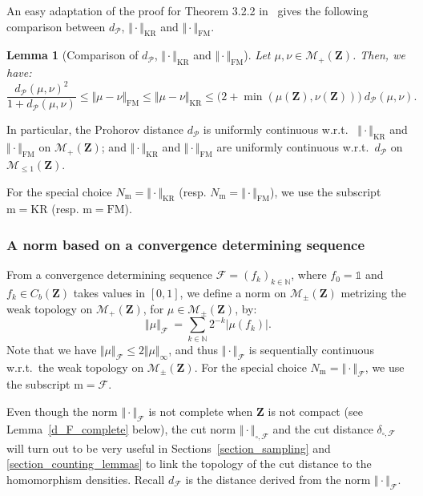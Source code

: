 \documentclass{amsart}
\newcommand{\wrt}{w.r.t.\ }
\theoremstyle{plain}
\newtheorem{lemme}[Th]{Lemma}
\theoremstyle{definition}
\newcommand{\Space}{\mathbf{Z}}
\newcommand{\SubProba}{\mathcal{M}_{\leq1}(\Space)}
\newcommand{\Meas}{\mathcal{M}_+(\Space)}
\newcommand{\SignedMeas}{\mathcal{M}_{\pm}(\Space)}
\newcommand{\CbFunct}{C_b(\Space)}
\newcommand{\TotalMass}[1]{\norm{#1}_\infty}
\newcommand{\m}{\mathrm{m}}
\newcommand{\NmeasSymbol}{N_\m}
\newcommand{\dmeasF}{d_{\mathcal{F}}}
\newcommand{\NmeasF}[1]{\Vert#1\Vert_{\mathcal{F}}}
\newcommand{\NmeasFSymbol}{\Vert\cdot\Vert_{\mathcal{F}}}
\newcommand{\NcutFSymbol}{\Vert\cdot\Vert_{\square,\mathcal{F}}}
\newcommand{\ddcutF}{\delta_{\square,\mathcal{F}}}
\newcommand{\F}{\mathcal{F}}
\newcommand{\dmeasP}{d_{\mathcal{P}}}
\newcommand{\mKR}{\text{KR}}
\newcommand{\NmeasKR}[1]{\Vert#1\Vert_{\mKR}}
\newcommand{\NmeasKRSymbol}{\Vert\cdot\Vert_{\mKR}}
\newcommand{\mFM}{\text{FM}}
\newcommand{\NmeasFM}[1]{\Vert#1\Vert_{\mFM}}
\newcommand{\NmeasFMSymbol}{\Vert\cdot\Vert_{\mFM}}
\newcommand{\un}{\mathds{1}}
\newcommand{\N}{\mathbb{N}}
\newcommand{\norm}[1]{\Vert#1\Vert}
\begin{document}
An easy adaptation of the proof for Theorem 3.2.2 in~\cite{Bogachev}
gives the following comparison between $\dmeasP$, $\NmeasKRSymbol$ and $\NmeasFMSymbol$.


\begin{lemme}[Comparison of $\dmeasP$, $\NmeasKRSymbol$ and $\NmeasFMSymbol$]
  \label{lemma_comp_Prohorov_KR_FM}
Let $\mu, \nu \in \Meas$. Then, we have:
\begin{equation*}
	\frac{\dmeasP(\mu,\nu)^2}{1+\dmeasP(\mu,\nu)}
	\leq \NmeasFM{\mu-\nu} \leq \NmeasKR{\mu-\nu}
	\leq \bigl(2+ \min(\mu(\Space), \nu(\Space))\bigr) \ \dmeasP(\mu,\nu).
\end{equation*}
\end{lemme}
In particular, the Prohorov distance $\dmeasP$ is uniformly continuous
\wrt 
$\NmeasKRSymbol$ and $\NmeasFMSymbol$ on $\Meas$;
and  $\NmeasKRSymbol$ and $\NmeasFMSymbol$
are uniformly continuous \wrt  $\dmeasP$ on $\SubProba$.

For the special choice $\NmeasSymbol=\NmeasKRSymbol$ (resp. $\NmeasSymbol=\NmeasFMSymbol$), 
we use the subscript $\m= \mKR$ (resp. $\m=\mFM$).



\subsubsection{A norm  based on a convergence determining sequence}
	\label{subsection_norm_F}

From  a  convergence determining  sequence  $\F=(f_k  )_{k\in\N}$,  where
$f_0=\un$  and $f_k \in\CbFunct$  takes values  in  $[0, 1]$,  we define  a norm  on
$\SignedMeas$ metrizing the weak topology on $\Meas$, for
$\mu\in \SignedMeas$, by:
\begin{equation}\label{eq_def_NmeasF}
\NmeasF{\mu}\ = \sum_{k\in \N} 2^{-k} |\mu(f_k)|.
\end{equation}
Note that we have $\NmeasF{\mu} \leq 2 \TotalMass{\mu}$,
	and thus $\NmeasFSymbol$ is
	sequentially continuous \wrt the weak topology on $\SignedMeas$.
For the special choice $\NmeasSymbol=\NmeasFSymbol$, 
we use the subscript $\m= \F$.



Even though  the norm $\NmeasFSymbol$  is not complete when  $\Space$ is
not compact (see Lemma~\ref{d_F_complete} below),  the cut norm $\NcutFSymbol$
and  the cut  distance $\ddcutF$  will  turn out  to be  very useful  in
Sections~\ref{section_sampling}  and   \ref{section_counting_lemmas}  to
link the topology of the cut distance to the homomorphism densities.
Recall $\dmeasF$ is the distance derived from the norm $\NmeasFSymbol$.
\end{document}
